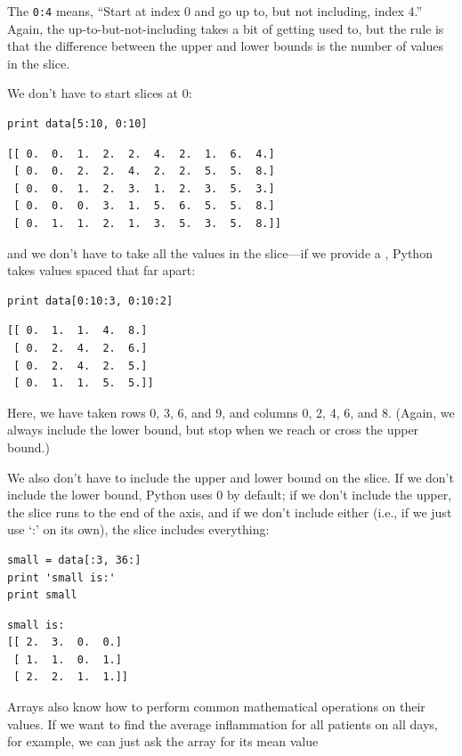 \documentclass{book}
\begin{document}
The  \texttt{0:4} means, ``Start at index 0 and
go up to, but not including, index 4.'' Again, the
up-to-but-not-including takes a bit of getting used to, but the rule is
that the difference between the upper and lower bounds is the number of
values in the slice.

We don't have to start slices at 0:

\begin{verbatim}
print data[5:10, 0:10]
\end{verbatim}

\begin{verbatim}
[[ 0.  0.  1.  2.  2.  4.  2.  1.  6.  4.]
 [ 0.  0.  2.  2.  4.  2.  2.  5.  5.  8.]
 [ 0.  0.  1.  2.  3.  1.  2.  3.  5.  3.]
 [ 0.  0.  0.  3.  1.  5.  6.  5.  5.  8.]
 [ 0.  1.  1.  2.  1.  3.  5.  3.  5.  8.]]
\end{verbatim}

and we don't have to take all the values in the slice---if we provide a
, Python takes values spaced that far apart:

\begin{verbatim}
print data[0:10:3, 0:10:2]
\end{verbatim}

\begin{verbatim}
[[ 0.  1.  1.  4.  8.]
 [ 0.  2.  4.  2.  6.]
 [ 0.  2.  4.  2.  5.]
 [ 0.  1.  1.  5.  5.]]
\end{verbatim}

Here, we have taken rows 0, 3, 6, and 9, and columns 0, 2, 4, 6, and 8.
(Again, we always include the lower bound, but stop when we reach or
cross the upper bound.)

We also don't have to include the upper and lower bound on the slice. If
we don't include the lower bound, Python uses 0 by default; if we don't
include the upper, the slice runs to the end of the axis, and if we
don't include either (i.e., if we just use `:' on its own), the slice
includes everything:

\begin{verbatim}
small = data[:3, 36:]
print 'small is:'
print small
\end{verbatim}

\begin{verbatim}
small is:
[[ 2.  3.  0.  0.]
 [ 1.  1.  0.  1.]
 [ 2.  2.  1.  1.]]
\end{verbatim}

Arrays also know how to perform common mathematical operations on their
values. If we want to find the average inflammation for all patients on
all days, for example, we can just ask the array for its mean value
\end{document}
